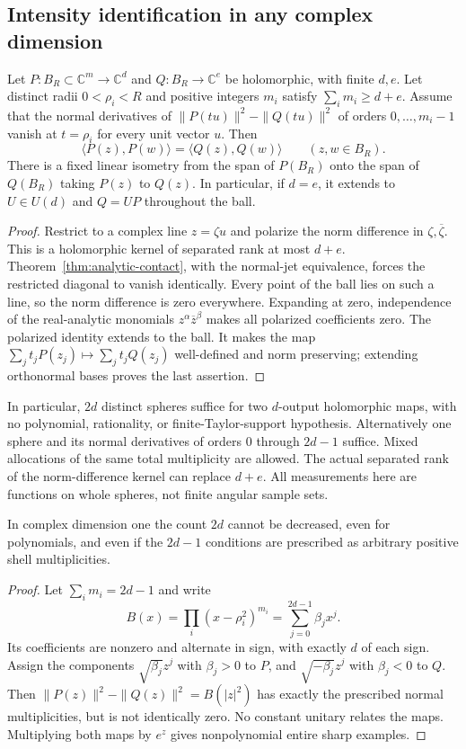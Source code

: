 \subsection{Intensity identification in any complex dimension}
\begin{theorem}\label{thm:holomorphic-identify}
Let $P:B_R\subset\mathbb C^m\to\mathbb C^d$ and
$Q:B_R\to\mathbb C^e$ be holomorphic, with finite $d,e$. Let distinct radii
$0<\rho_i<R$ and positive integers $m_i$ satisfy $\sum_i m_i\ge d+e$.
Assume that the normal derivatives of
$\|P(tu)\|^2-\|Q(tu)\|^2$ of orders $0,\ldots,m_i-1$ vanish at $t=\rho_i$
for every unit vector $u$. Then
\[
 \langle P(z),P(w)\rangle=\langle Q(z),Q(w)\rangle
 \qquad(z,w\in B_R).
\]
There is a fixed linear isometry from the span of $P(B_R)$ onto the span of
$Q(B_R)$ taking $P(z)$ to $Q(z)$. In particular, if $d=e$, it extends to
$U\in U(d)$ and $Q=UP$ throughout the ball.
\end{theorem}
\begin{proof}
Restrict to a complex line $z=\zeta u$ and polarize the norm difference in
$\zeta,\overline\zeta$. This is a holomorphic kernel of separated rank at
most $d+e$. Theorem~\ref{thm:analytic-contact}, with the normal-jet equivalence,
forces the restricted diagonal to vanish identically. Every point of the
ball lies on such a line, so the norm difference is zero everywhere.
Expanding at zero, independence of the real-analytic monomials
$z^\alpha\overline z^\beta$ makes all polarized coefficients zero.
The polarized identity extends to the ball. It makes the map
$\sum_j t_jP(z_j)\mapsto\sum_jt_jQ(z_j)$ well-defined and norm preserving;
extending orthonormal bases proves the last assertion.
\end{proof}

In particular, $2d$ distinct spheres suffice for two $d$-output holomorphic
maps, with no polynomial, rationality, or finite-Taylor-support hypothesis.
Alternatively one sphere and its normal derivatives of orders $0$ through
$2d-1$ suffice. Mixed allocations of the same total multiplicity are allowed.
The actual separated rank of the norm-difference kernel can replace $d+e$.
All measurements here are functions on whole spheres, not finite angular
sample sets.

\begin{proposition}
In complex dimension one the count $2d$ cannot be decreased, even for
polynomials, and even if the $2d-1$ conditions are prescribed as arbitrary
positive shell multiplicities.
\end{proposition}
\begin{proof}
Let $\sum_i m_i=2d-1$ and write
\[
 B(x)=\prod_i(x-\rho_i^2)^{m_i}=\sum_{j=0}^{2d-1}\beta_jx^j.
\]
Its coefficients are nonzero and alternate in sign, with exactly $d$ of
each sign. Assign the components $\sqrt{\beta_j}z^j$ with $\beta_j>0$ to
$P$, and $\sqrt{-\beta_j}z^j$ with $\beta_j<0$ to $Q$. Then
$\|P(z)\|^2-\|Q(z)\|^2=B(|z|^2)$ has exactly the prescribed normal
multiplicities, but is not identically zero. No constant unitary relates the
maps. Multiplying both maps by $e^z$ gives nonpolynomial entire sharp examples.
\end{proof}

